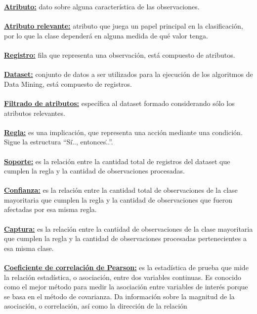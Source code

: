             \underline{\textbf{Atributo:}}  dato sobre alguna característica de las
            observaciones.\\\\
            \underline{\textbf{Atributo relevante:}} atributo que juega un papel principal
            en la clasificación, por lo que la clase dependerá en alguna medida de
            qué valor tenga.\\\\
            \underline{\textbf{Registro:}} fila que representa una observación, está
            compuesto de atributos.\\\\
            \underline{\textbf{Dataset:}} conjunto de datos a ser utilizados para la
            ejecución de los algoritmos de Data Mining, está compuesto de registros.\\\\
            \underline{\textbf{Filtrado de atributos:}} específica al dataset formado
            considerando sólo los atributos relevantes.\\\\
            \underline{\textbf{Regla:}} es una implicación, que representa una acción
            mediante una condición. Sigue la estructura “Si\..., entonces\...”.\\\\
            \underline{\textbf{Soporte:}} es la relación entre la cantidad total de
            registros del dataset que cumplen la regla y la cantidad de observaciones
            procesadas.\\\\
            \underline{\textbf{Confianza:}} es la relación entre la cantidad total de
            observaciones de la clase mayoritaria que cumplen la regla y la cantidad
            de observaciones que fueron afectadas por esa misma regla.\\\\
            \underline{\textbf{Captura:}} es la relación entre la cantidad de
            observaciones de la clase mayoritaria que cumplen la regla y la cantidad de
            observaciones procesadas pertenecientes a esa misma clase.\\\\
            \underline{\textbf{Coeficiente de correlación de Pearson:}} es la estadística
            de prueba que mide la relación estadística, o asociación, entre dos
            variables continuas. Es conocido como el mejor método para medir la
            asociación entre variables de interés porque se basa en el método de
            covarianza. Da información sobre la magnitud de la asociación, o
            correlación, así como la dirección de la relación\\\\


